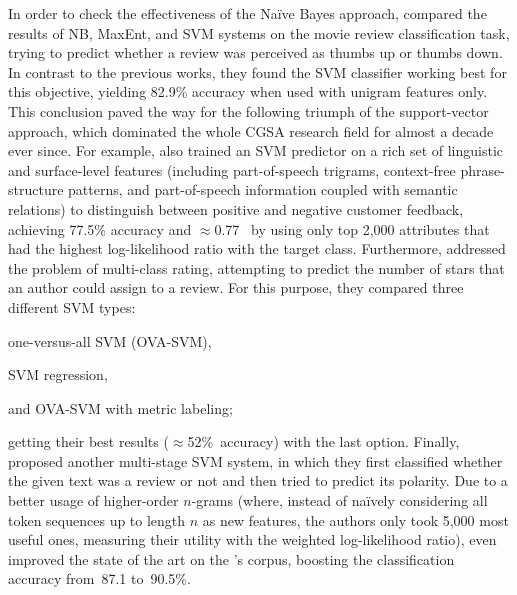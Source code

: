 In order to check the effectiveness of the Na{\"i}ve Bayes approach,
\citet{Pang:02} compared the results of NB, MaxEnt, and SVM systems on
the movie review classification task, trying to predict whether a
review was perceived as thumbs up or thumbs down.  In contrast to the
previous works, they found the SVM classifier working best for this
objective, yielding 82.9\% accuracy when used with unigram features
only.  This conclusion paved the way for the following triumph of the
support-vector approach, which dominated the whole CGSA research field
for almost a decade ever since.  For example, \citet{Gamon:04} also
trained an SVM predictor on a rich set of linguistic and surface-level
features (including part-of-speech trigrams, context-free
phrase-structure patterns, and part-of-speech information coupled with
semantic relations) to distinguish between positive and negative
customer feedback, achieving 77.5\% accuracy and $\approx$0.77~\F{} by
using only top 2,000 attributes that had the highest log-likelihood
ratio with the target class.  %
Furthermore, \citet{Pang:05} addressed the problem of multi-class
rating, attempting to predict the number of stars that an author could
assign to a review.  For this purpose, they compared three different
SVM types:
\begin{inparaenum}[(i)]
\item one-versus-all SVM (OVA-SVM),
\item SVM regression,
\item and OVA-SVM with metric labeling;
\end{inparaenum}
getting their best results ($\approx$52\%~accuracy) with the last
option.
Finally, \citet{Ng:06} proposed another multi-stage SVM system, in
which they first classified whether the given text was a review or not
and then tried to predict its polarity.  Due to a better usage of
higher-order $n$-grams (where, instead of na{\"i}vely considering all
token sequences up to length $n$ as new features, the authors only
took 5,000 most useful ones, measuring their utility with the weighted
log-likelihood ratio), \citet{Ng:06} even improved the state of the
art on the \citeauthor{Pang:04}'s corpus, boosting the classification
accuracy from~87.1 to~90.5\%.

